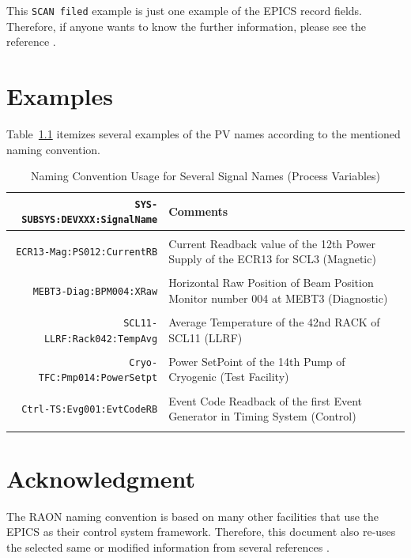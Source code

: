 \documentclass[11pt
  , a4paper
  , article
  , oneside
]{memoir}
\begin{document}
This \texttt{SCAN filed} example is just one example of the EPICS record fields. Therefore, if anyone wants to know the further information, please see the reference \cite{EPICS3.14-RRM}.

\clearpage
\chapter{Examples}
Table~\ref{table:naming_convention} itemizes several examples of the PV names according to the mentioned naming convention.

\begin{table}[!bt]
\caption{Naming Convention Usage for Several Signal Names (Process Variables)}
\label{table:naming_convention}
\centering%
\begin{tabular}{r|p{7.2cm}l} 
\toprule 
\texttt{SYS-SUBSYS:DEVXXX:SignalName} &Comments\\ 
\midrule
&\\
\texttt{ECR13-Mag:PS012:CurrentRB}    & Current Readback value of the 12th Power Supply of the ECR13 for SCL3 (Magnetic)\\
&\\
\texttt{MEBT3-Diag:BPM004:XRaw}       & Horizontal Raw Position of Beam Position Monitor number 004 at MEBT3 (Diagnostic) \\
&\\
\texttt{SCL11-LLRF:Rack042:TempAvg}   & Average Temperature of the 42nd RACK of SCL11 (LLRF)\\
&\\
\texttt{Cryo-TFC:Pmp014:PowerSetpt}   & Power SetPoint of the 14th Pump of Cryogenic (Test Facility)\\
&\\
\texttt{Ctrl-TS:Evg001:EvtCodeRB}     & Event Code Readback of the first Event Generator in Timing System (Control)\\
&\\
\bottomrule
\end{tabular}
\end{table}

\chapter{Acknowledgment}
The RAON naming convention is based on many other facilities that use the EPICS as their control system framework. Therefore, this document also re-uses the selected same or modified information from several references  \cite{DaveGurd, NCSNS,NCESS, NCNSLSII}. 


\clearpage
%
%
%

%

\end{document}

